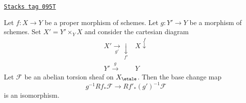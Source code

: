 \begin{theorem}

\label{etale-cohomology-theorem-proper-base-change}
\href{https://stacks.math.columbia.edu/tag/095T}{\texttt{Stacks tag 095T}}

Let $f : X \to Y$ be a proper morphism of schemes. Let $g : Y' \to Y$ be
a morphism of schemes. Set $X' = Y' \times_Y X$
and consider the cartesian diagram
$$
\begin{array}{cc}X' \underset{g'}{\longrightarrow}\underset{f'}{\downarrow} & X \overset{f}{\downarrow} \\ Y' \overset{g}{\longrightarrow} & Y\end{array}
$$
Let $\mathcal{F}$ be an abelian torsion sheaf on $X_\etale$.
Then the base change map
$$
g^{-1}Rf_*\mathcal{F} \longrightarrow Rf'_*(g')^{-1}\mathcal{F}
$$
is an isomorphism.
\end{theorem}

